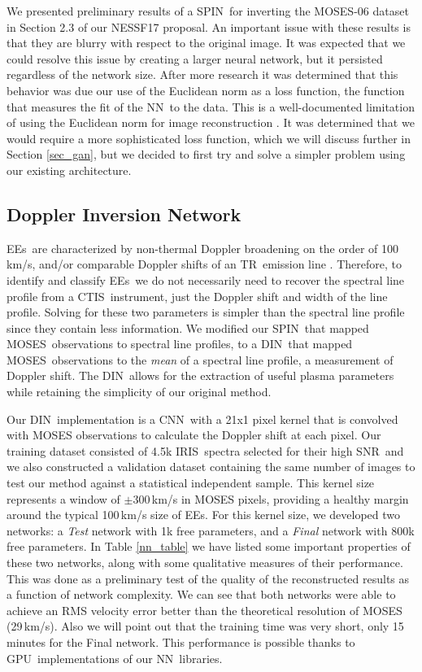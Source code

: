 \documentclass[10pt,letterpaper]{article}
\newcommand{\TR}{\ac{TR}}
\newcommand{\EEs}{\acp{EE}}
\newcommand{\CTIS}{\ac{CTIS}}
\newcommand{\MOSES}{\ac{MOSES}}
\newcommand{\NN}{\ac{NN}}
\newcommand{\CNN}{\ac{CNN}}
\newcommand{\DIN}{\ac{DIN}}
\newcommand{\SPIN}{\ac{SPIN}}
\newcommand{\IRIS}{\ac{IRIS}}
\newcommand{\GPU}{\ac{GPU}}
\newcommand{\SNR}{\ac{SNR}}
\begin{document}
		We presented preliminary results of a \SPIN\ for inverting the \MOSES-06 dataset in Section 2.3 of our NESSF17 proposal.
		An important issue with these results is that they are blurry with respect to the original image.
		It was expected that we could resolve this issue by creating a larger neural network, but it persisted regardless of the network size.
		After more research it was determined that this behavior was due our use of the Euclidean norm as a loss function, the function that measures the fit of the \NN\ to the data.
		This is a well-documented limitation of using the Euclidean norm for image reconstruction \citep{Pathak2016}.
		It was determined that we would require a more sophisticated loss function, which we will discuss further in Section \ref{sec_gan}, but we decided to first try and solve a simpler problem using our existing architecture.
					
		\subsection{Doppler Inversion Network}
		
			\EEs\ are characterized by non-thermal Doppler broadening on the order of 100\,km/s, and/or comparable Doppler shifts of an \TR\ emission line \citep{Dere1989}.
			Therefore, to identify and classify \EEs\ we do not necessarily need to recover the spectral line profile from a \CTIS\ instrument, just the Doppler shift and width of the line profile.
			Solving for these two parameters is simpler than the spectral line profile since they contain less information.
			We modified our \SPIN\ that mapped \MOSES\ observations to spectral line profiles, to a \DIN\ that mapped \MOSES\ observations to the \textit{mean} of a spectral line profile, a measurement of Doppler shift.
			The \DIN\ allows for the extraction of useful plasma parameters while retaining the simplicity of our original method.
			
			Our \DIN\ implementation is a \CNN\ with a 21x1 pixel kernel that is convolved with MOSES observations to calculate the Doppler shift at each pixel.
			Our training dataset consisted of 4.5k \IRIS\ spectra selected for their high \SNR\, and we also constructed a validation dataset containing the same number of images to test our method against a statistical independent sample.
			This kernel size represents a window of $\pm$300\,km/s in MOSES pixels, providing a healthy margin around the typical 100\,km/s size of \EEs \citep{Dere1994}.
			For this kernel size, we developed two networks: a \textit{Test} network with 1k free parameters, and a \textit{Final} network with 800k free parameters.
			In Table \ref{nn_table} we have listed some important properties of these two networks, along with some qualitative measures of their performance.
			This was done as a preliminary test of the quality of the reconstructed results as a function of network complexity.
			We can see that both networks were able to achieve an RMS velocity error better than the theoretical resolution of MOSES (29\,km/s).
			Also we will point out that the training time was very short, only 15 minutes for the Final network.
			This performance is possible thanks to \GPU\ implementations of our \NN\ libraries.
			
\end{document}
